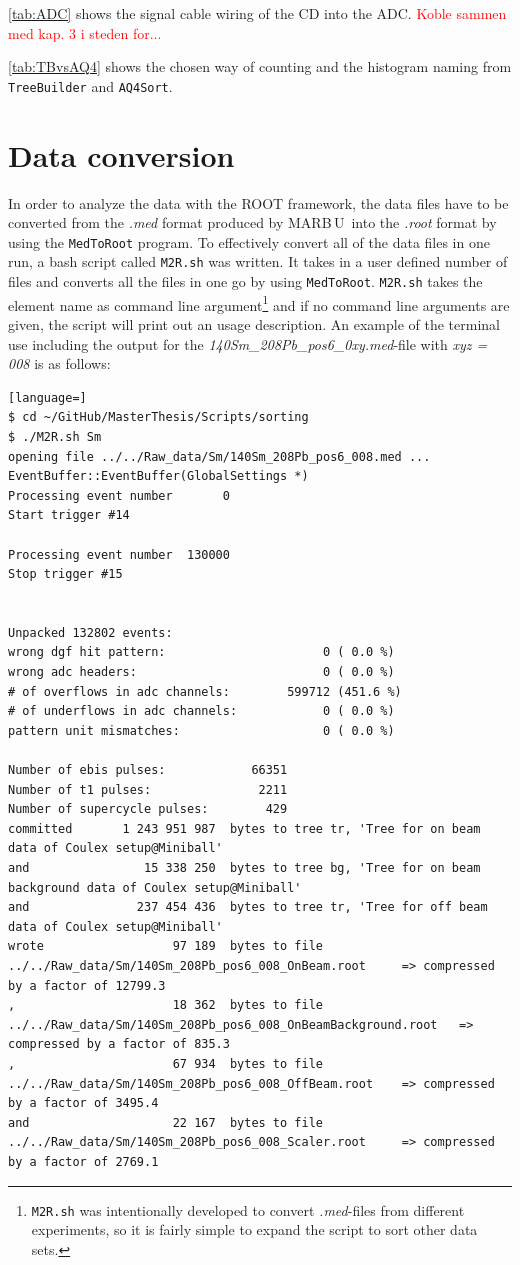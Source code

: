 \documentclass[twoside,english]{uiofysmaster/uiofysmaster}
\newcommand{\MBOU}{MAR\belowbaseline[-2pt]{a}B\stackinset{l}{3pt}{b}{-3pt}{O}{O}\,U}
\let\orgautoref\autoref
\renewcommand{\autoref}
        {%
		 \def\sectionautorefname{Section}%
		 \def\subsectionautorefname{Section}%
		 \def\subsubsectionautorefname{Section}%
		 \def\chapterautorefname{Chapter}%
          \orgautoref}
\begin{document}
\autoref{tab:ADC} shows the signal cable wiring of the CD into the ADC. \textcolor{red}{Koble sammen med kap. 3 i steden for...}

\autoref{tab:TBvsAQ4} shows the chosen way of counting and the histogram naming from \texttt{TreeBuilder} and \texttt{AQ4Sort}.


\section{Data conversion}\label{sec:data_conversion}
In order to analyze the data with the ROOT framework, the data files have to be converted from the 
\textit{.med} format produced by \MBOU\ into the \textit{.root} format by using the \texttt{MedToRoot} program. 
To effectively convert all of the data files in one run, a bash script called \texttt{M2R.sh} was written.
It takes in a user defined number of files and converts all the files in one go by using \texttt{MedToRoot}.
\texttt{M2R.sh} takes the element name as command line argument\footnote{\texttt{M2R.sh} was intentionally developed to convert \textit{.med}-files from different experiments, so it is fairly simple to expand the script to sort other data sets.} and if no command line arguments are given, the script will print out an usage description.
An example of the terminal use including the output for the \textit{140Sm\_208Pb\_pos6\_0xy.med}-file with \textit{xyz = 008} is as follows: 

\begin{lstlisting}[language=]
$ cd ~/GitHub/MasterThesis/Scripts/sorting
$ ./M2R.sh Sm
opening file ../../Raw_data/Sm/140Sm_208Pb_pos6_008.med ...
EventBuffer::EventBuffer(GlobalSettings *)
Processing event number       0
Start trigger #14

Processing event number  130000
Stop trigger #15


Unpacked 132802 events:
wrong dgf hit pattern:                      0 ( 0.0 %)
wrong adc headers:                          0 ( 0.0 %)
# of overflows in adc channels:        599712 (451.6 %)
# of underflows in adc channels:            0 ( 0.0 %)
pattern unit mismatches:                    0 ( 0.0 %)

Number of ebis pulses:            66351
Number of t1 pulses:               2211
Number of supercycle pulses:        429
committed       1 243 951 987  bytes to tree tr, 'Tree for on beam data of Coulex setup@Miniball'
and                15 338 250  bytes to tree bg, 'Tree for on beam background data of Coulex setup@Miniball'
and               237 454 436  bytes to tree tr, 'Tree for off beam data of Coulex setup@Miniball'
wrote                  97 189  bytes to file ../../Raw_data/Sm/140Sm_208Pb_pos6_008_OnBeam.root 	=> compressed by a factor of 12799.3
,                      18 362  bytes to file ../../Raw_data/Sm/140Sm_208Pb_pos6_008_OnBeamBackground.root 	=> compressed by a factor of 835.3
,                      67 934  bytes to file ../../Raw_data/Sm/140Sm_208Pb_pos6_008_OffBeam.root 	=> compressed by a factor of 3495.4
and                    22 167  bytes to file ../../Raw_data/Sm/140Sm_208Pb_pos6_008_Scaler.root 	=> compressed by a factor of 2769.1
\end{lstlisting}
\end{document}
